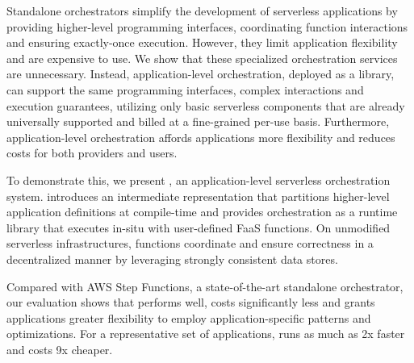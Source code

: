 Standalone orchestrators simplify the development of serverless applications
by providing higher-level programming interfaces, coordinating function
interactions and ensuring exactly-once execution. However, they limit
application flexibility and are expensive to use. We show that these
specialized orchestration services are unnecessary. Instead, application-level
orchestration, deployed as a library, can support the same programming
interfaces, complex interactions and execution guarantees, utilizing only
basic serverless components that are already universally supported and billed
at a fine-grained per-use basis. Furthermore, application-level orchestration
affords applications more flexibility and reduces costs for both providers and
users.

To demonstrate this, we present \name{}, an application-level serverless
orchestration system. \name{} introduces an intermediate representation that
partitions higher-level application definitions at compile-time and provides
orchestration as a runtime library that executes in-situ with user-defined
FaaS functions. On unmodified serverless infrastructures, \name{} functions
coordinate and ensure correctness in a decentralized manner by leveraging
strongly consistent data stores.

Compared with AWS Step Functions, a state-of-the-art standalone orchestrator,
our evaluation shows that \name{} performs well, costs significantly less and
grants applications greater flexibility to employ application-specific
patterns and optimizations. For a representative set of applications, \name{}
runs as much as 2x faster and costs 9x cheaper.